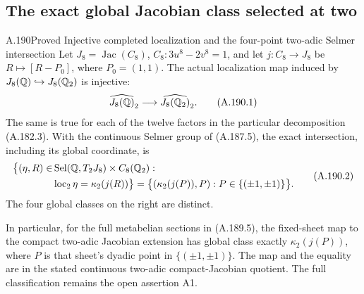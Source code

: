 \subsection{The exact global Jacobian class selected at two}

\begin{statement}{A.190}{Proved}
{Injective completed localization and the four-point two-adic Selmer intersection}
Let \(J_8=\operatorname{Jac}(C_8)\),
\(C_8:3u^8-2v^8=1\), and let
\(j:C_8\to J_8\) be \(R\mapsto[R-P_0]\),
where \(P_0=(1,1)\).  The actual localization map
induced by \(J_8(\mathbb Q)\hookrightarrow J_8(\mathbb Q_2)\)
is injective:
\[
 \widehat{J_8(\mathbb Q)}_2
         \longrightarrow\widehat{J_8(\mathbb Q_2)}_2.
\tag{A.190.1}
\]
The same is true for each of the twelve factors in
the particular decomposition (A.182.3).
With the continuous Selmer group of (A.187.5), the
exact intersection, including its global coordinate,
is
\[
\begin{aligned}
\bigl\{(\eta,R)\in&\operatorname{Sel}(\mathbb Q,T_2J_8)
                         \times C_8(\mathbb Q_2):\\
       &\operatorname{loc}_2\eta=\kappa_2(j(R))\bigr\}
   =\bigl\{(\kappa_2(j(P)),P):
                   P\in\{(\pm1,\pm1)\}\bigr\}.
\end{aligned}
\tag{A.190.2}
\]
The four global classes on the right are distinct.

In particular, for the full metabelian sections in
(A.189.5), the fixed-sheet map to the compact
two-adic Jacobian extension has global class exactly
\(\kappa_2(j(P))\), where \(P\) is that sheet's
dyadic point in \(\{(\pm1,\pm1)\}\).
The map and the equality are in the stated continuous
two-adic compact-Jacobian quotient.  The full
classification remains the open assertion A1.
\end{statement}

